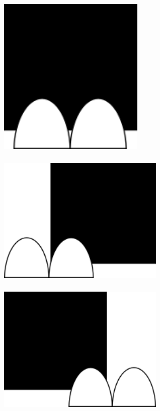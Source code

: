 \documentclass[svgnames,11pt]{beamer}
\begin{document}
\begin{frame}
    \frametitle{}

    \begin{center}
    \centering
    \includegraphics[width=7cm]{ressources/diode1.png}
    \label{IMG}
    \end{center}

\end{frame}
\begin{frame}
    \frametitle{}

    \begin{center}
    \centering
    \includegraphics[width=8cm]{ressources/diode2.png}
    \label{IMG}
    \end{center}

\end{frame}
\begin{frame}
    \frametitle{}

    \begin{center}
    \centering
    \includegraphics[width=8cm]{ressources/diode3.png}
    \label{IMG}
    \end{center}

\end{frame}
\end{document}
